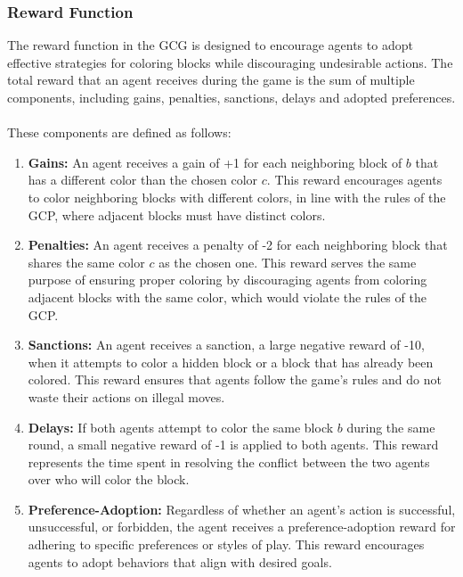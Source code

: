 \begin{flushleft}
    \subsubsection{Reward Function}

    \begin{flushleft}

        The reward function in the GCG is designed to encourage agents to adopt effective strategies for coloring blocks while discouraging undesirable actions. The total reward that an agent receives during the game is the sum of multiple components, including gains, penalties, sanctions, delays and adopted preferences.\\~\\

        These components are defined as follows:

        \begin{enumerate}
            \item \textbf{Gains:} An agent receives a gain of +1 for each neighboring block of $b$ that has a different color than the chosen color $c$. This reward encourages agents to color neighboring blocks with different colors, in line with the rules of the GCP, where adjacent blocks must have distinct colors.
            
            \item \textbf{Penalties:} An agent receives a penalty of -2 for each neighboring block that shares the same color $c$ as the chosen one. This reward serves the same purpose of ensuring proper coloring by discouraging agents from coloring adjacent blocks with the same color, which would violate the rules of the GCP.
            
            \item \textbf{Sanctions:} An agent receives a sanction, a large negative reward of -10, when it attempts to color a hidden block or a block that has already been colored. This reward ensures that agents follow the game’s rules and do not waste their actions on illegal moves.
            
            \item \textbf{Delays:} If both agents attempt to color the same block $b$ during the same round, a small negative reward of -1 is applied to both agents. This reward represents the time spent in resolving the conflict between the two agents over who will color the block.
            
            \item \textbf{Preference-Adoption:} Regardless of whether an agent’s action is successful, unsuccessful, or forbidden, the agent receives a preference-adoption reward for adhering to specific preferences or styles of play. This reward encourages agents to adopt behaviors that align with desired goals.
        \end{enumerate}

    \end{flushleft}

\end{flushleft}
